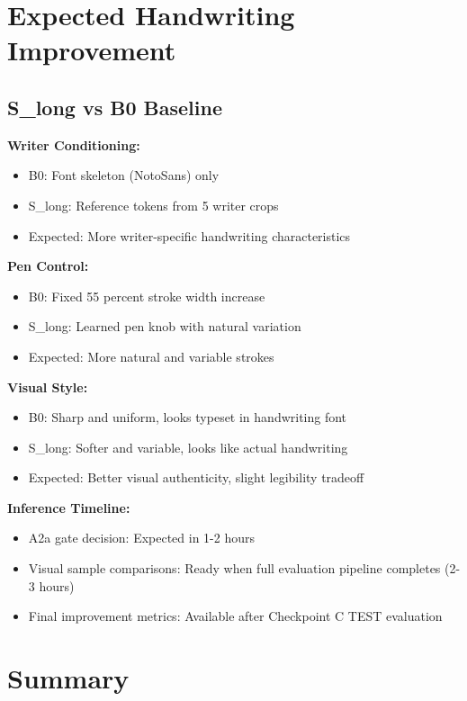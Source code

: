 \documentclass[12pt,a4paper]{article}
\begin{document}
\section{Expected Handwriting Improvement}

\subsection{S\_long vs B0 Baseline}

\textbf{Writer Conditioning:}
\begin{itemize}
  \item B0: Font skeleton (NotoSans) only
  \item S\_long: Reference tokens from 5 writer crops
  \item Expected: More writer-specific handwriting characteristics
\end{itemize}

\textbf{Pen Control:}
\begin{itemize}
  \item B0: Fixed 55 percent stroke width increase
  \item S\_long: Learned pen knob with natural variation
  \item Expected: More natural and variable strokes
\end{itemize}

\textbf{Visual Style:}
\begin{itemize}
  \item B0: Sharp and uniform, looks typeset in handwriting font
  \item S\_long: Softer and variable, looks like actual handwriting
  \item Expected: Better visual authenticity, slight legibility tradeoff
\end{itemize}

\textbf{Inference Timeline:}
\begin{itemize}
  \item A2a gate decision: Expected in 1-2 hours
  \item Visual sample comparisons: Ready when full evaluation pipeline completes (2-3 hours)
  \item Final improvement metrics: Available after Checkpoint C TEST evaluation
\end{itemize}

\newpage

\section*{Summary}
\end{document}
